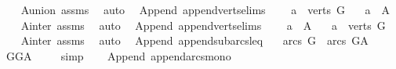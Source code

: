 \begin{isabellebody}
%
\isadelimproof
\ \ %
\endisadelimproof
%
\isatagproof
{}\isamarkupfalse%
\ A{\isacharunderscore}{\kern0pt}union\ assms\ \isamarkupfalse%
\ auto%
\endisatagproof
{\isafoldproof}%
%
\isadelimproof
\isanewline
%
\endisadelimproof
\isanewline
{}\isamarkupfalse%
\ {\isacharparenleft}{\kern0pt}\ Append{\isacharparenright}{\kern0pt}\ append{\isacharunderscore}{\kern0pt}verts{\isacharunderscore}{\kern0pt}elims{\isacharcolon}{\kern0pt}\ \isanewline
\ \ \ {\isachardoublequoteopen}a\ {\isasymin}\ verts\ G{\isachardoublequoteclose}\isanewline
\ \ \ {\isachardoublequoteopen}a\ {\isasymnotin}\ A{\isachardoublequoteclose}\isanewline
%
\isadelimproof
\ \ %
\endisadelimproof
%
\isatagproof
{}\isamarkupfalse%
\ A{\isacharunderscore}{\kern0pt}inter\ assms\ \isamarkupfalse%
\ auto%
\endisatagproof
{\isafoldproof}%
%
\isadelimproof
\isanewline
%
\endisadelimproof
\isanewline
{}\isamarkupfalse%
\ {\isacharparenleft}{\kern0pt}\ Append{\isacharparenright}{\kern0pt}\ append{\isacharunderscore}{\kern0pt}verts{\isacharunderscore}{\kern0pt}elims{\isacharprime}{\kern0pt}{\isacharcolon}{\kern0pt}\ \isanewline
\ \ \ {\isachardoublequoteopen}a\ {\isasymin}\ A{\isachardoublequoteclose}\isanewline
\ \ \ {\isachardoublequoteopen}a\ {\isasymnotin}\ verts\ G{\isachardoublequoteclose}\isanewline
%
\isadelimproof
\ \ %
\endisadelimproof
%
\isatagproof
{}\isamarkupfalse%
\ A{\isacharunderscore}{\kern0pt}inter\ assms\ \isamarkupfalse%
\ auto%
\endisatagproof
{\isafoldproof}%
%
\isadelimproof
\isanewline
%
\endisadelimproof
\isanewline
{}\isamarkupfalse%
\ {\isacharparenleft}{\kern0pt}\ Append{\isacharparenright}{\kern0pt}\ append{\isacharunderscore}{\kern0pt}subarcs{\isacharunderscore}{\kern0pt}leq{\isacharcolon}{\kern0pt}\ \isanewline
\ \ {\isachardoublequoteopen}arcs\ G\ {\isasymsubseteq}\ arcs\ G{\isacharunderscore}{\kern0pt}A{\isachardoublequoteclose}\isanewline
%
\isadelimproof
\ \ %
\endisadelimproof
%
\isatagproof
{}\isamarkupfalse%
\ GG{\isacharunderscore}{\kern0pt}A\ \isanewline
\ \ \isamarkupfalse%
\ simp%
\endisatagproof
{\isafoldproof}%
%
\isadelimproof
\ \isanewline
%
\endisadelimproof
\isanewline
{}\isamarkupfalse%
\ {\isacharparenleft}{\kern0pt}\ Append{\isacharparenright}{\kern0pt}\ append{\isacharunderscore}{\kern0pt}arcs{\isacharunderscore}{\kern0pt}mono{\isacharcolon}{\kern0pt}\isanewline

\end{isabellebody}
